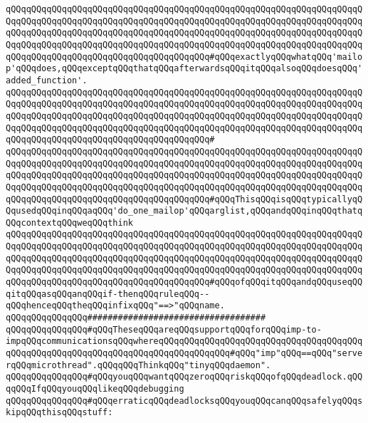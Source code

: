 \verb|qQQqqQQqqQQqqQQqqQQqqQQqqQQqqQQqqQQqqQQqqQQqqQQqqQQqqQQqqQQqqQQqqQQqqQQqqQQqqQQqqQQqqQQqqQQqqQQqqQQqqQQqqQQqqQQqqQQqqQQqqQQqqQQqqQQqqQQqqQQqqQQqqQQqqQQqqQQqqQQqqQQqqQQqqQQqqQQqqQQqqQQqqQQqqQQqqQQqqQQqqQQqqQQqqQQqqQQqqQQqqQQqqQQqqQQqqQQqqQQqqQQqqQQqqQQqqQQqqQQqqQQqqQQqqQQqqQQqqQQqqQQqqQQqqQQqqQQqqQQqqQQqqQQqqQQqqQQqqQQq#qQQqexactlyqQQqwhatqQQq'mailop'qQQqdoes,qQQqexceptqQQqthatqQQqafterwardsqQQqitqQQqalsoqQQqdoesqQQq'added_function'.|\newline
\verb|qQQqqQQqqQQqqQQqqQQqqQQqqQQqqQQqqQQqqQQqqQQqqQQqqQQqqQQqqQQqqQQqqQQqqQQqqQQqqQQqqQQqqQQqqQQqqQQqqQQqqQQqqQQqqQQqqQQqqQQqqQQqqQQqqQQqqQQqqQQqqQQqqQQqqQQqqQQqqQQqqQQqqQQqqQQqqQQqqQQqqQQqqQQqqQQqqQQqqQQqqQQqqQQqqQQqqQQqqQQqqQQqqQQqqQQqqQQqqQQqqQQqqQQqqQQqqQQqqQQqqQQqqQQqqQQqqQQqqQQqqQQqqQQqqQQqqQQqqQQqqQQqqQQqqQQqqQQqqQQq#|\newline
\verb|qQQqqQQqqQQqqQQqqQQqqQQqqQQqqQQqqQQqqQQqqQQqqQQqqQQqqQQqqQQqqQQqqQQqqQQqqQQqqQQqqQQqqQQqqQQqqQQqqQQqqQQqqQQqqQQqqQQqqQQqqQQqqQQqqQQqqQQqqQQqqQQqqQQqqQQqqQQqqQQqqQQqqQQqqQQqqQQqqQQqqQQqqQQqqQQqqQQqqQQqqQQqqQQqqQQqqQQqqQQqqQQqqQQqqQQqqQQqqQQqqQQqqQQqqQQqqQQqqQQqqQQqqQQqqQQqqQQqqQQqqQQqqQQqqQQqqQQqqQQqqQQqqQQqqQQqqQQqqQQq#qQQqThisqQQqisqQQqtypicallyqQQqusedqQQqinqQQqaqQQq'do_one_mailop'qQQqarglist,qQQqandqQQqinqQQqthatqQQqcontextqQQqweqQQqthink|\newline
\verb|qQQqqQQqqQQqqQQqqQQqqQQqqQQqqQQqqQQqqQQqqQQqqQQqqQQqqQQqqQQqqQQqqQQqqQQqqQQqqQQqqQQqqQQqqQQqqQQqqQQqqQQqqQQqqQQqqQQqqQQqqQQqqQQqqQQqqQQqqQQqqQQqqQQqqQQqqQQqqQQqqQQqqQQqqQQqqQQqqQQqqQQqqQQqqQQqqQQqqQQqqQQqqQQqqQQqqQQqqQQqqQQqqQQqqQQqqQQqqQQqqQQqqQQqqQQqqQQqqQQqqQQqqQQqqQQqqQQqqQQqqQQqqQQqqQQqqQQqqQQqqQQqqQQqqQQqqQQqqQQq#qQQqofqQQqitqQQqandqQQquseqQQqitqQQqasqQQqanqQQqif-thenqQQqruleqQQq--qQQqhenceqQQqtheqQQqinfixqQQq"==>"qQQqname.|\newline
\newline
\newline
\verb|qQQqqQQqqQQqqQQq###################################|\newline
\verb|qQQqqQQqqQQqqQQq#qQQqTheseqQQqareqQQqsupportqQQqforqQQqimp-to-impqQQqcommunicationsqQQqwhereqQQqqQQqqQQqqQQqqQQqqQQqqQQqqQQqqQQqqQQqqQQqqQQqqQQqqQQqqQQqqQQqqQQqqQQqqQQqqQQqqQQq#qQQq"imp"qQQq==qQQq"serverqQQqmicrothread".qQQqqQQqThinkqQQq"tinyqQQqdaemon".|\newline
\verb|qQQqqQQqqQQqqQQq#qQQqyouqQQqwantqQQqzeroqQQqriskqQQqofqQQqdeadlock.qQQqqQQqIfqQQqyouqQQqlikeqQQqdebugging|\newline
\verb|qQQqqQQqqQQqqQQq#qQQqerraticqQQqdeadlocksqQQqyouqQQqcanqQQqsafelyqQQqskipqQQqthisqQQqstuff:|\newline
